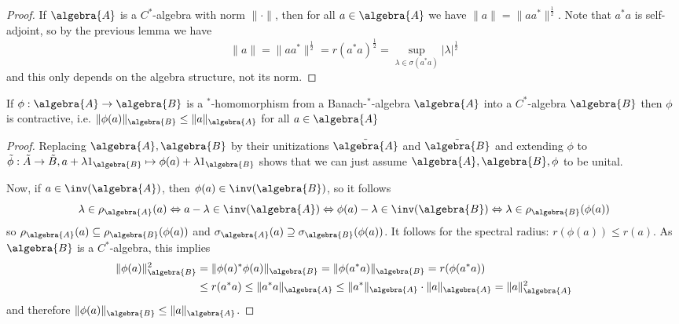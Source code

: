 \documentclass[a4paper]{article}
\begin{document}
\begin{proof}
	If $\algebra{A}$ is a $C^*$-algebra with norm $\| \cdot \|$, then for all $a \in \algebra{A}$ we have $\|a\| = \|a a^*\|^{\frac{1}{2}}$. Note that $a^*a$ is self-adjoint, so by the previous lemma we have
	\begin{equation*}
		\|a\| = \|a a^*\|^{\frac{1}{2}} = r(a^* a)^\frac{1}{2} = \sup_{\lambda \in \sigma(a^* a)} |\lambda|^{\frac{1}{2}}
	\end{equation*}
	and this only depends on the algebra structure, not its norm.
\end{proof}

\begin{corollary}
	If $\phi: \algebra{A} \to \algebra{B}$ is a $^*$-homomorphism from a Banach-$^*$-algebra $\algebra{A}$ into a $C^*$-algebra $\algebra{B}$ then $\phi$ is contractive, i.e. $\|\phi(a)\|_\algebra{B} \leq \|a\|_\algebra{A}$ for all $a \in \algebra{A}$
\end{corollary}

\begin{proof}
	Replacing $\algebra{A}, \algebra{B}$ by their unitizations $\tilde{\algebra{A}}$ and $\tilde{\algebra{B}}$ and extending $\phi$ to $\tilde{\phi}: \tilde{A} \to \tilde{B}, a + \lambda 1_\algebra{B} \mapsto \phi(a) + \lambda 1_\algebra{B}$ shows that we can just assume $\algebra{A}, \algebra{B}, \phi$ to be unital.
	
	Now, if $a \in \inv(\algebra{A})$, then $\phi(a) \in \inv(\algebra{B})$, so it follows
	\begin{equation*}
		\lambda \in \rho_\algebra{A}(a) \iff a - \lambda \in \inv(\algebra{A}) \iff \phi(a) - \lambda \in \inv(\algebra{B}) \iff \lambda \in \rho_\algebra{B}(\phi(a))
	\end{equation*}
	so $\rho_\algebra{A}(a) \subseteq \rho_\algebra{B}(\phi(a))$ and $\sigma_\algebra{A}(a) \supseteq \sigma_\algebra{B}(\phi(a))$.
	It follows for the spectral radius: $r(\phi(a)) \leq r(a)$.
	As $\algebra{B}$ is a $C^*$-algebra, this implies
	\begin{align*}
		\|\phi(a)\|_\algebra{B}^2 &= \|\phi(a)^* \phi(a)\|_\algebra{B} = \|\phi(a^*a)\|_\algebra{B} = r(\phi(a^* a)) \\ &\leq r(a^* a) \leq \|a^* a\|_\algebra{A} \leq \|a^*\|_\algebra{A} \cdot \|a\|_\algebra{A} = \|a\|_\algebra{A}^2
	\end{align*}
	and therefore $\|\phi(a)\|_\algebra{B} \leq \|a\|_\algebra{A}$.
\end{proof}
\end{document}

